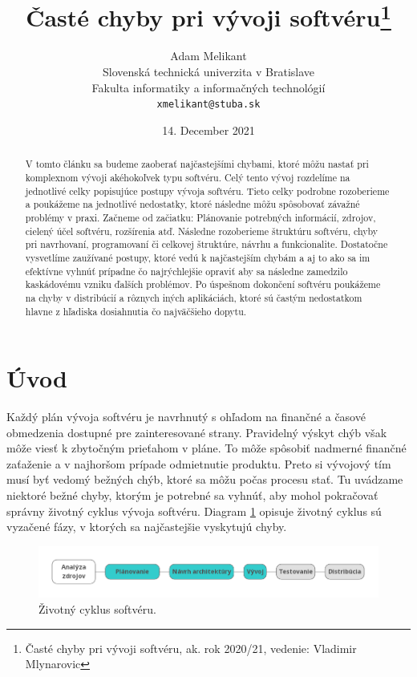 \documentclass[10pt,twoside,slovak,a4paper]{article}
\title{Časté chyby pri vývoji softvéru\thanks{Časté chyby pri vývoji softvéru, ak. rok 2020/21, vedenie: Vladimir Mlynarovic}} %
\author{Adam Melikant\\[2pt]
	{\small Slovenská technická univerzita v Bratislave}\\
	{\small Fakulta informatiky a informačných technológií}\\
	{\small \texttt{xmelikant@stuba.sk}}
	}
\date{\small 14. December 2021} %
\begin{document}
\maketitle

\begin{abstract}
V tomto článku sa budeme zaoberať najčastejšími chybami, ktoré môžu nastať pri komplexnom vývoji akéhokoľvek typu softvéru. Celý tento vývoj rozdelíme na jednotlivé celky popisujúce postupy vývoja softvéru. Tieto celky podrobne rozoberieme a poukážeme na jednotlivé nedostatky, ktoré následne môžu spôsobovať závažné problémy v praxi. Začneme od začiatku: Plánovanie potrebných informácií, zdrojov, cielený účel softvéru, rozšírenia atď. Následne rozoberieme štruktúru softvéru, chyby pri navrhovaní, programovaní či celkovej štruktúre, návrhu a funkcionalite. Dostatočne vysvetlíme zaužívané postupy, ktoré vedú k najčastejším chybám a aj to ako sa im efektívne vyhnúť prípadne čo najrýchlejšie opraviť aby sa následne zamedzilo kaskádovému vzniku ďalších problémov. Po úspešnom dokončení softvéru poukážeme na chyby v distribúcií a rôznych iných aplikáciách, ktoré sú častým nedostatkom hlavne z hľadiska dosiahnutia čo najväčšieho dopytu.
\end{abstract}


\section{Úvod}
Každý plán vývoja softvéru je navrhnutý s ohľadom na finančné a časové obmedzenia dostupné pre zainteresované strany. Pravidelný výskyt chýb však môže viesť k zbytočným prieťahom v pláne. To môže spôsobiť nadmerné finančné zaťaženie a v najhoršom prípade odmietnutie produktu. Preto si vývojový tím musí byť vedomý bežných chýb, ktoré sa môžu počas procesu stať. Tu uvádzame niektoré bežné chyby, ktorým je potrebné sa vyhnúť, aby mohol pokračovať správny životný cyklus vývoja softvéru. %
Diagram \ref{fig:D1} opisuje životný cyklus sú vyzačené fázy, v ktorých sa najčastejšie vyskytujú chyby.
\begin{figure}[h]
    \centering
    \includegraphics[scale=0.35]{vyvoj_diagram.png}
    \caption{Životný cyklus softvéru.}
    \label{fig:D1}
\end{figure}
\end{document}
